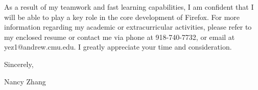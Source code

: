 \documentclass{kindofneat}
\begin{document}
As a result of my teamwork and fast learning capabilities, I am confident that I will be able to play a key role in the core development of Firefox. For more information regarding my academic or extracurricular activities, please refer to my enclosed resume or contact me via phone at 918-740-7732, or email at yez1@andrew.cmu.edu. I greatly appreciate your time and consideration.

\vspace*{1em}
\noindent Sincerely,

\vspace*{2em}
\noindent Nancy Zhang
\end{document}
